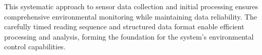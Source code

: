 This systematic approach to sensor data collection and initial processing ensures comprehensive environmental monitoring while maintaining data reliability. The carefully timed reading sequence and structured data format enable efficient processing and analysis, forming the foundation for the system's environmental control capabilities.
